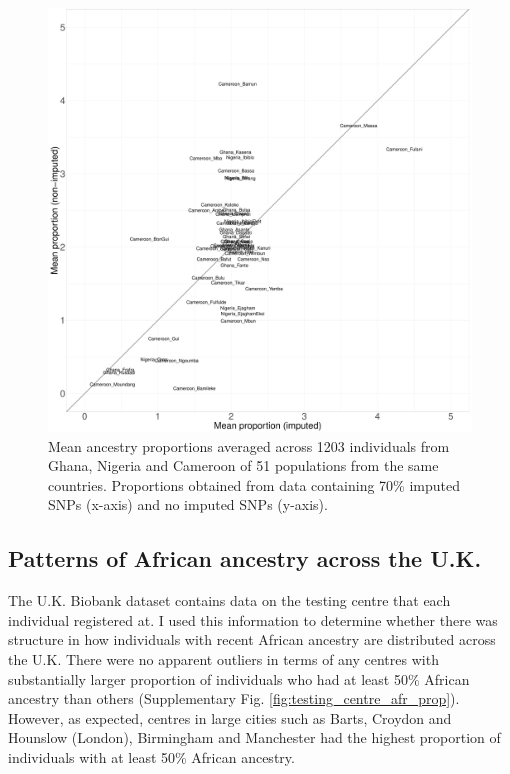 \begin{figure}[htp]
    \centering
    \includegraphics[width=1.0\textwidth]{../images/chapter3/SOURCEFIND_imp_nonimp.pdf}
    \caption{Mean ancestry proportions averaged across 1203 individuals from Ghana, Nigeria and Cameroon of 51 populations from the same countries. Proportions obtained from data containing 70\% imputed SNPs (x-axis) and no imputed SNPs (y-axis).}
    \label{fig:SOURCEFIND_imp_nonimp}
\end{figure}


\subsection{Patterns of African ancestry across the U.K.}

The U.K. Biobank dataset contains data on the testing centre that each individual registered at. I used this information to determine whether there was structure in how individuals with recent African ancestry are distributed across the U.K. There were no apparent outliers in terms of any centres with substantially larger proportion of individuals who had at least 50\% African ancestry than others (Supplementary Fig. \ref{fig:testing_centre_afr_prop}). However, as expected, centres in large cities such as Barts, Croydon and Hounslow (London), Birmingham and Manchester had the highest proportion of individuals with at least 50\% African ancestry.


